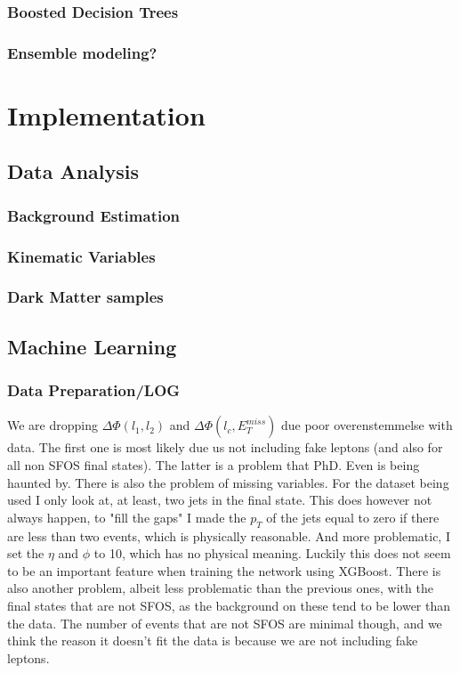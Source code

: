 \documentclass[14pt, a4paper]{book}
\begin{document}
\section{Boosted Decision Trees}


\section{Ensemble modeling?}

\part{Implementation}
\chapter{Data Analysis}
\section{Background Estimation}
\section{Kinematic Variables}
\section{Dark Matter samples}

\chapter{Machine Learning}
\section{Data Preparation/LOG}
We are dropping $\Delta\Phi(l_1,l_2)$ and $\Delta\Phi(l_c,E_T^{miss})$ due poor overenstemmelse with data. The first one is most likely due us not including fake leptons (and also for all non SFOS final states). The latter is a problem that PhD. Even is being haunted by. There is also the problem of missing variables. For the dataset being used I only look at, at least, two jets in the final state. This does however not always happen, to "fill the gaps" I made the $p_T$ of the jets equal to zero if there are less than two events, which is physically reasonable. And more problematic, I set the $\eta$ and $\phi$ to 10, which has no physical meaning. Luckily this does not seem to be an important feature when training the network using XGBoost. There is also another problem, albeit less problematic than the previous ones, with the final states that are not SFOS, as the background on these tend to be lower than the data. The number of events that are not SFOS are minimal though, and we think the reason it doesn't fit the data is because we are not including fake leptons.
\end{document}
